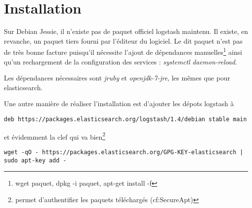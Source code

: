 \section{Installation}
%
%
%
%
%
%
%
%
%




Sur Debian Jessie, il n'existe pas de paquet officiel logstash maintenu. Il existe,
en revanche, un paquet tiers
fourni par l'éditeur du logiciel. Le dit paquet n'est pas de très bonne facture  
puisqu'il nécessite l'ajout de dépendances manuelles\footnote{wget paquet, 
dpkg -i paquet, apt-get install -f} ainsi qu'un rechargement de 
la configuration des services : \emph{systemctl daemon-reload}.

Les dépendances nécessaires sont \emph{jruby} et \emph{openjdk-7-jre}, les mêmes 
que pour elasticsearch.

Une autre manière de réaliser l'installation est d'ajouter les dépots logstash à 

\begin{lstlisting}[style=code,label={lst:ajoutdepotlogstash}]
deb https://packages.elasticsearch.org/logstash/1.4/debian stable main
\end{lstlisting}

et évidemment la clef qui va bien\footnote{permet d'authentifier les paquets téléchargés
(cf:SecureApt)}

\begin{lstlisting}[style=code,label={lst:ajoutclefdepotlogstash}]
wget -qO - https://packages.elasticsearch.org/GPG-KEY-elasticsearch | sudo apt-key add -
\end{lstlisting}

